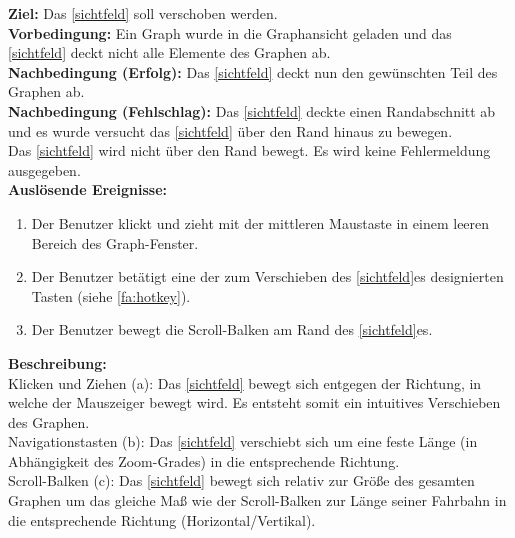 \label{fa:verschieben}
\textbf{Ziel:} Das \ref{sichtfeld} soll verschoben werden.\\
\textbf{Vorbedingung:} Ein Graph wurde in die Graphansicht geladen und das \ref{sichtfeld} deckt nicht alle Elemente des Graphen ab.\\
\textbf{Nachbedingung (Erfolg):}  Das \ref{sichtfeld} deckt nun den gewünschten Teil des Graphen ab.\\
\textbf{Nachbedingung (Fehlschlag):} Das \ref{sichtfeld} deckte einen Randabschnitt ab und es wurde versucht das \ref{sichtfeld} über den Rand hinaus zu bewegen.\\
Das \ref{sichtfeld} wird nicht über den Rand bewegt. Es wird keine Fehlermeldung ausgegeben.\\
\textbf{Auslösende Ereignisse:}
\begin{enumerate}[nolistsep, label=(\alph*)]
  \item Der Benutzer klickt und zieht mit der mittleren Maustaste in einem leeren Bereich des Graph-Fenster.
  \item Der Benutzer betätigt eine der zum Verschieben des \ref{sichtfeld}es designierten Tasten (siehe \ref{fa:hotkey}).
  \item Der Benutzer bewegt die Scroll-Balken am Rand des \ref{sichtfeld}es. %
\end{enumerate}
\textbf{Beschreibung:}\\
Klicken und Ziehen (a): Das \ref{sichtfeld} bewegt sich entgegen der Richtung, in welche der Mauszeiger bewegt wird. Es entsteht somit ein intuitives Verschieben des Graphen.\\
Navigationstasten (b): Das \ref{sichtfeld} verschiebt sich um eine feste Länge (in Abhängigkeit des Zoom-Grades) in die entsprechende Richtung.\\
Scroll-Balken (c): Das \ref{sichtfeld} bewegt sich relativ zur Größe des gesamten Graphen um das gleiche Maß wie der Scroll-Balken zur Länge seiner Fahrbahn in die entsprechende Richtung (Horizontal/Vertikal).\\


